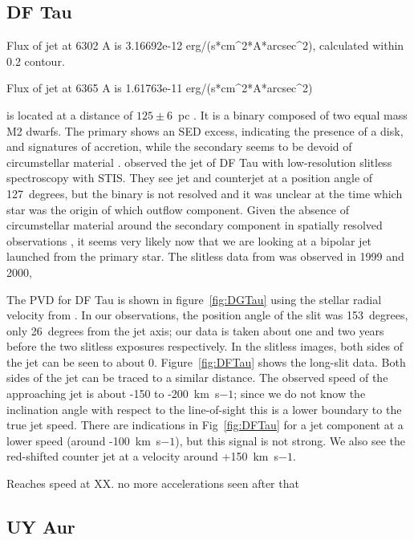 \documentclass[twocolumn]{aastex62}
\begin{document}
\subsection{DF Tau}

Flux of jet at 6302 A is 3.16692e-12 erg/(s*cm\^{}2*A*arcsec\^{}2),
calculated within 0.2 contour.

Flux of jet at 6365 A is 1.61763e-11 erg/(s*cm\^{}2*A*arcsec\^{}2) ~

 is located at a distance of $125\pm6$~pc \citep{2016A&A...595A...1G,2018A&A...616A...1G}. It is a binary composed of two equal mass M2 dwarfs. The primary shows an SED excess, indicating the presence of a disk, and signatures of accretion, while the secondary seems to be devoid of circumstellar material \citep{2017ApJ...845..161A}. \citet{2004ApJ...609..261H} observed the jet of DF Tau with low-resolution slitless spectroscopy with STIS. They see jet and counterjet at a
position angle of 127~degrees, but the binary is not resolved and it was unclear at the time which star was the origin of which outflow component. Given the absence of circumstellar material around the secondary component in spatially resolved observations \citep{2017ApJ...845..161A}, it seems very likely now that we are looking at a bipolar jet launched from the primary star. 
The slitless data from \citet{2004ApJ...609..261H} was observed in 1999 and 2000,

The PVD for DF Tau is shown in figure~\ref{fig:DGTau}
using the stellar radial velocity from \citet{2006AstL...32..759G}.
In our observations, the position angle of the slit was 153~degrees, only 26~degrees from the jet axis; our data is taken about one and two years before the two slitless exposures respectively. In the slitless images, both sides of the jet can be seen to about 0. Figure~\ref{fig:DFTau} shows the long-slit data. Both sides of the jet can be traced to a similar distance. The observed speed of the approaching jet is about -150 to -200~km~s${-1}$; since we do not know the inclination angle with respect to the line-of-sight this is a lower boundary to the true jet speed. There are indications in Fig~\ref{fig:DFTau} for a jet component at a lower speed (around -100~km~s${-1}$), but this signal is not strong. We also see the red-shifted counter jet at a velocity around +150~km~s${-1}$.

Reaches speed at XX. no more accelerations seen after that


\subsection{UY Aur}
\end{document}
